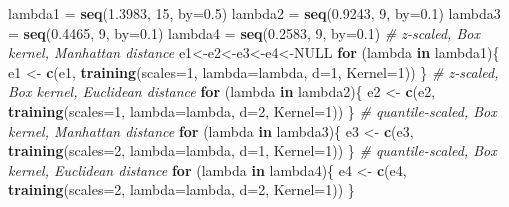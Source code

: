 \documentclass[12pt]{article}
\newenvironment{Shaded}{\begin{snugshade}}{\end{snugshade}}
\newcommand{\AttributeTok}[1]{\textcolor[rgb]{0.13,0.29,0.53}{#1}}
\newcommand{\CommentTok}[1]{\textcolor[rgb]{0.56,0.35,0.01}{\textit{#1}}}
\newcommand{\ConstantTok}[1]{\textcolor[rgb]{0.56,0.35,0.01}{#1}}
\newcommand{\ControlFlowTok}[1]{\textcolor[rgb]{0.13,0.29,0.53}{\textbf{#1}}}
\newcommand{\DecValTok}[1]{\textcolor[rgb]{0.00,0.00,0.81}{#1}}
\newcommand{\FloatTok}[1]{\textcolor[rgb]{0.00,0.00,0.81}{#1}}
\newcommand{\FunctionTok}[1]{\textcolor[rgb]{0.13,0.29,0.53}{\textbf{#1}}}
\newcommand{\NormalTok}[1]{#1}
\newcommand{\OtherTok}[1]{\textcolor[rgb]{0.56,0.35,0.01}{#1}}
\begin{document}
\begin{Shaded}
\begin{Highlighting}[]
\NormalTok{lambda1 }\OtherTok{=} \FunctionTok{seq}\NormalTok{(}\FloatTok{1.3983}\NormalTok{, }\DecValTok{15}\NormalTok{, }\AttributeTok{by=}\FloatTok{0.5}\NormalTok{)}
\NormalTok{lambda2 }\OtherTok{=} \FunctionTok{seq}\NormalTok{(}\FloatTok{0.9243}\NormalTok{, }\DecValTok{9}\NormalTok{, }\AttributeTok{by=}\FloatTok{0.1}\NormalTok{)}
\NormalTok{lambda3 }\OtherTok{=} \FunctionTok{seq}\NormalTok{(}\FloatTok{0.4465}\NormalTok{, }\DecValTok{9}\NormalTok{, }\AttributeTok{by=}\FloatTok{0.1}\NormalTok{)}
\NormalTok{lambda4 }\OtherTok{=} \FunctionTok{seq}\NormalTok{(}\FloatTok{0.2583}\NormalTok{, }\DecValTok{9}\NormalTok{, }\AttributeTok{by=}\FloatTok{0.1}\NormalTok{)}
\CommentTok{\# z{-}scaled, Box kernel, Manhattan distance}
\NormalTok{e1}\OtherTok{\textless{}{-}}\NormalTok{e2}\OtherTok{\textless{}{-}}\NormalTok{e3}\OtherTok{\textless{}{-}}\NormalTok{e4}\OtherTok{\textless{}{-}}\ConstantTok{NULL}
\ControlFlowTok{for}\NormalTok{ (lambda }\ControlFlowTok{in}\NormalTok{ lambda1)\{}
\NormalTok{e1 }\OtherTok{\textless{}{-}} \FunctionTok{c}\NormalTok{(e1, }\FunctionTok{training}\NormalTok{(}\AttributeTok{scales=}\DecValTok{1}\NormalTok{, }\AttributeTok{lambda=}\NormalTok{lambda, }\AttributeTok{d=}\DecValTok{1}\NormalTok{, }\AttributeTok{Kernel=}\DecValTok{1}\NormalTok{))}
\NormalTok{\}}
\CommentTok{\# z{-}scaled, Box kernel, Euclidean distance}
\ControlFlowTok{for}\NormalTok{ (lambda }\ControlFlowTok{in}\NormalTok{ lambda2)\{}
\NormalTok{e2 }\OtherTok{\textless{}{-}} \FunctionTok{c}\NormalTok{(e2, }\FunctionTok{training}\NormalTok{(}\AttributeTok{scales=}\DecValTok{1}\NormalTok{, }\AttributeTok{lambda=}\NormalTok{lambda, }\AttributeTok{d=}\DecValTok{2}\NormalTok{, }\AttributeTok{Kernel=}\DecValTok{1}\NormalTok{))}
\NormalTok{\}}
\CommentTok{\# quantile{-}scaled, Box kernel, Manhattan distance}
\ControlFlowTok{for}\NormalTok{ (lambda }\ControlFlowTok{in}\NormalTok{ lambda3)\{}
\NormalTok{e3 }\OtherTok{\textless{}{-}} \FunctionTok{c}\NormalTok{(e3, }\FunctionTok{training}\NormalTok{(}\AttributeTok{scales=}\DecValTok{2}\NormalTok{, }\AttributeTok{lambda=}\NormalTok{lambda, }\AttributeTok{d=}\DecValTok{1}\NormalTok{, }\AttributeTok{Kernel=}\DecValTok{1}\NormalTok{))}
\NormalTok{\}}
\CommentTok{\# quantile{-}scaled, Box kernel, Euclidean distance}
\ControlFlowTok{for}\NormalTok{ (lambda }\ControlFlowTok{in}\NormalTok{ lambda4)\{}
\NormalTok{e4 }\OtherTok{\textless{}{-}} \FunctionTok{c}\NormalTok{(e4, }\FunctionTok{training}\NormalTok{(}\AttributeTok{scales=}\DecValTok{2}\NormalTok{, }\AttributeTok{lambda=}\NormalTok{lambda, }\AttributeTok{d=}\DecValTok{2}\NormalTok{, }\AttributeTok{Kernel=}\DecValTok{1}\NormalTok{))}
\NormalTok{\}}
\end{Highlighting}
\end{Shaded}
\end{document}
